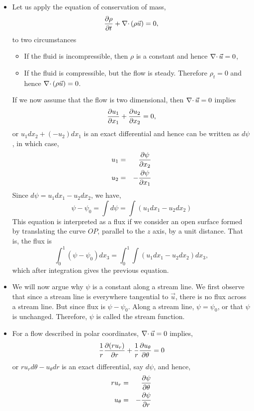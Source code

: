 \begin{itemize}
\item Let us apply the equation of conservation of mass,
\begin{equation}\label{c2s2e1a}
\frac{\partial{\rho}}{\partial{t}} + \operatorname{\nabla\cdot}{(\rho\vec{u})} = 0,
\end{equation}
to two circumstances 
\begin{itemize}
\item If the fluid is incompressible, then $\rho$ is a constant and hence $\operatorname{\nabla\cdot}{\vec{u}} = 0$,
\item If the fluid is compressible, but the flow is steady. Therefore $\rho_t = 0$ and hence $\operatorname{\nabla\cdot}{(\rho\vec{u})} = 0$.
\end{itemize}
If we now assume that the flow is two dimensional, then $\operatorname{\nabla\cdot}{\vec{u}} = 0$ implies 
\[
\frac{\partial{u_1}}{\partial{x_1}} + \frac{\partial{u_2}}{\partial{x_2}} = 0,
\]
or $u_1 dx_2 + (-u_2)dx_1$ is an exact differential and hence can be written as $d\psi$, in which case,
\begin{eqnarray*}
u_1 &=& \frac{\partial{\psi}}{\partial{x_2}} \\
u_2 &=& -\frac{\partial{\psi}}{\partial{x_1}}
\end{eqnarray*}
Since $d\psi = u_1 dx_1 - u_2 dx_2$, we have,
\[
\psi - \psi_0 = \int d\psi = \int (u_1 dx_1 - u_2 dx_2)
\]
This equation is interpreted as a flux if we consider an open surface formed by translating the curve $OP$, parallel to the $z$ axis, by a unit distance. That is, the flux is
\[
\int_0^1 (\psi - \psi_0)dx_3 = \int_0^1 \int (u_1 dx_1 - u_2 dx_2) dx_3,
\]
which after integration gives the previous equation.

\item We will now argue why $\psi$ is a constant along a stream line. We first observe that since a stream line is everywhere tangential to $\vec{u}$, there is no flux across a 
stream line. But since flux is $\psi - \psi_0$. Along a stream line, $\psi = \psi_0$, or that $\psi$ is unchanged. Therefore, $\psi$ is called the stream function.

\item For a flow described in polar coordinates, $\operatorname{\nabla\cdot}{\vec{u}} = 0$ implies,
\[
\frac{1}{r}\frac{\partial{(ru_r)}}{\partial{r}} + \frac{1}{r}\frac{\partial{u_\theta}}{\partial{\theta}} = 0
\]
or $ru_r d\theta - u_\theta dr$ is an exact differential, say $d\psi$, and hence,
\begin{eqnarray*}
ru_r &=& \frac{\partial{\psi}}{\partial{\theta}} \\
u_\theta &=& -\frac{\partial{\psi}}{\partial{r}}
\end{eqnarray*}


\end{itemize}
